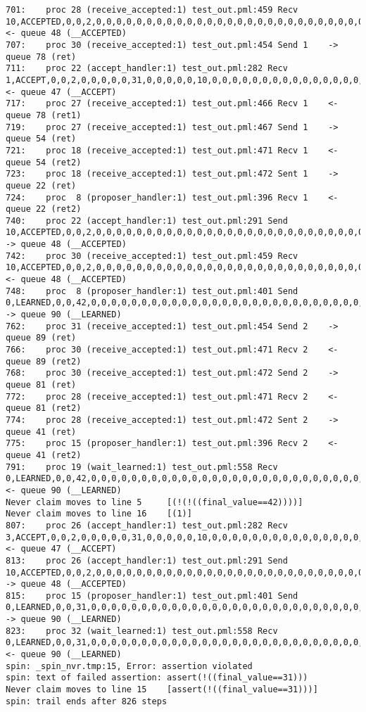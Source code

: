 \begin{lstlisting}[xleftmargin=.01\linewidth, xrightmargin=0.01\linewidth, caption={Message passing caused by the proposer's protocol bug.}, label={lst:paxos_bug}]
701:    proc 28 (receive_accepted:1) test_out.pml:459 Recv 10,ACCEPTED,0,0,2,0,0,0,0,0,0,0,0,0,0,0,0,0,0,0,0,0,0,0,0,0,0,0,0,0,0,0,0,0,0,0,0,0  <- queue 48 (__ACCEPTED)
707:    proc 30 (receive_accepted:1) test_out.pml:454 Send 1    -> queue 78 (ret)
711:    proc 22 (accept_handler:1) test_out.pml:282 Recv 1,ACCEPT,0,0,2,0,0,0,0,0,31,0,0,0,0,0,10,0,0,0,0,0,0,0,0,0,0,0,0,0,0,0,0,0,0,0,0,0     <- queue 47 (__ACCEPT)
717:    proc 27 (receive_accepted:1) test_out.pml:466 Recv 1    <- queue 78 (ret1)
719:    proc 27 (receive_accepted:1) test_out.pml:467 Send 1    -> queue 54 (ret)
721:    proc 18 (receive_accepted:1) test_out.pml:471 Recv 1    <- queue 54 (ret2)
723:    proc 18 (receive_accepted:1) test_out.pml:472 Sent 1    -> queue 22 (ret)
724:    proc  8 (proposer_handler:1) test_out.pml:396 Recv 1    <- queue 22 (ret2)
740:    proc 22 (accept_handler:1) test_out.pml:291 Send 10,ACCEPTED,0,0,2,0,0,0,0,0,0,0,0,0,0,0,0,0,0,0,0,0,0,0,0,0,0,0,0,0,0,0,0,0,0,0,0,0    -> queue 48 (__ACCEPTED)
742:    proc 30 (receive_accepted:1) test_out.pml:459 Recv 10,ACCEPTED,0,0,2,0,0,0,0,0,0,0,0,0,0,0,0,0,0,0,0,0,0,0,0,0,0,0,0,0,0,0,0,0,0,0,0,0  <- queue 48 (__ACCEPTED)
748:    proc  8 (proposer_handler:1) test_out.pml:401 Send 0,LEARNED,0,0,42,0,0,0,0,0,0,0,0,0,0,0,0,0,0,0,0,0,0,0,0,0,0,0,0,0,0,0,0,0,0,0,0,0   -> queue 90 (__LEARNED)
762:    proc 31 (receive_accepted:1) test_out.pml:454 Send 2    -> queue 89 (ret)
766:    proc 30 (receive_accepted:1) test_out.pml:471 Recv 2    <- queue 89 (ret2)
768:    proc 30 (receive_accepted:1) test_out.pml:472 Send 2    -> queue 81 (ret)
772:    proc 28 (receive_accepted:1) test_out.pml:471 Recv 2    <- queue 81 (ret2)
774:    proc 28 (receive_accepted:1) test_out.pml:472 Sent 2    -> queue 41 (ret)
775:    proc 15 (proposer_handler:1) test_out.pml:396 Recv 2    <- queue 41 (ret2)
791:    proc 19 (wait_learned:1) test_out.pml:558 Recv 0,LEARNED,0,0,42,0,0,0,0,0,0,0,0,0,0,0,0,0,0,0,0,0,0,0,0,0,0,0,0,0,0,0,0,0,0,0,0,0       <- queue 90 (__LEARNED)
Never claim moves to line 5     [(!(!((final_value==42))))]
Never claim moves to line 16    [(1)]
807:    proc 26 (accept_handler:1) test_out.pml:282 Recv 3,ACCEPT,0,0,2,0,0,0,0,0,31,0,0,0,0,0,10,0,0,0,0,0,0,0,0,0,0,0,0,0,0,0,0,0,0,0,0,0     <- queue 47 (__ACCEPT)
813:    proc 26 (accept_handler:1) test_out.pml:291 Send 10,ACCEPTED,0,0,2,0,0,0,0,0,0,0,0,0,0,0,0,0,0,0,0,0,0,0,0,0,0,0,0,0,0,0,0,0,0,0,0,0    -> queue 48 (__ACCEPTED)
815:    proc 15 (proposer_handler:1) test_out.pml:401 Send 0,LEARNED,0,0,31,0,0,0,0,0,0,0,0,0,0,0,0,0,0,0,0,0,0,0,0,0,0,0,0,0,0,0,0,0,0,0,0,0   -> queue 90 (__LEARNED)
823:    proc 32 (wait_learned:1) test_out.pml:558 Recv 0,LEARNED,0,0,31,0,0,0,0,0,0,0,0,0,0,0,0,0,0,0,0,0,0,0,0,0,0,0,0,0,0,0,0,0,0,0,0,0       <- queue 90 (__LEARNED)
spin: _spin_nvr.tmp:15, Error: assertion violated
spin: text of failed assertion: assert(!((final_value==31)))
Never claim moves to line 15    [assert(!((final_value==31)))]
spin: trail ends after 826 steps
\end{lstlisting}